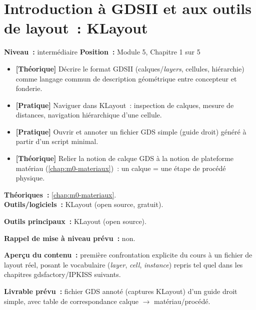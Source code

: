 
\chapter{Introduction à GDSII et aux outils de layout~: KLayout}
\label{chap:m5-gdsii}

\noindent\textbf{Niveau~:} intermédiaire \hfill \textbf{Position~:} Module 5, Chapitre 1 sur 5

\begin{objectifs}
\begin{itemize}[leftmargin=1.4em]
  \item \textbf{[Théorique]} Décrire le format GDSII (calques/\emph{layers}, cellules, hiérarchie) comme langage commun de description géométrique entre concepteur et fonderie.
  \item \textbf{[Pratique]} Naviguer dans KLayout~: inspection de calques, mesure de distances, navigation hiérarchique d'une cellule.
  \item \textbf{[Pratique]} Ouvrir et annoter un fichier GDS simple (guide droit) généré à partir d'un script minimal.
  \item \textbf{[Théorique]} Relier la notion de calque GDS à la notion de plateforme matériau (\cref{chap:m0-materiaux})~: un calque = une étape de procédé physique.
\end{itemize}
\end{objectifs}

\begin{prerequis}
\textbf{Théoriques~:} \cref{chap:m0-materiaux}.\\
\textbf{Outils/logiciels~:} KLayout (open source, gratuit).
\end{prerequis}

\noindent\textbf{Outils principaux~:} KLayout (open source).

\noindent\textbf{Rappel de mise à niveau prévu~:} non.

\noindent\textbf{Aperçu du contenu~:} première confrontation explicite du cours à un fichier de layout réel, posant le vocabulaire (\emph{layer}, \emph{cell}, \emph{instance}) repris tel quel dans les chapitres gdsfactory/IPKISS suivants.

\noindent\textbf{Livrable prévu~:} fichier GDS annoté (captures KLayout) d'un guide droit simple, avec table de correspondance calque $\to$ matériau/procédé.

